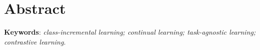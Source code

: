 \chapter*{Abstract}
\label{abstract}


\textbf{Keywords}: \emph{class-incremental learning; continual learning;
task-agnostic learning; contrastive learning}.

